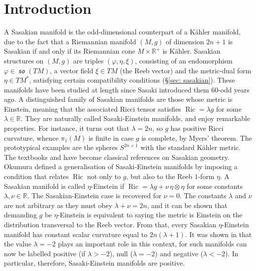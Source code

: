 \documentclass[12pt, twoside]{amsart}
\def\R{\mathbb{R}}
\newcommand{\lie}[1]{\mathfrak{#1}}
\DeclareMathOperator{\so}{\lie{so}}
\def\ric{\operatorname{Ric}}
\theoremstyle{definition}
\begin{document}
\tableofcontents


\section{Introduction}

A Sasakian manifold is the odd-dimensional counterpart of a K{\"a}hler manifold, due to the fact that a Riemannian manifold $(M, g)$ of dimension $2n+1$ is Sasakian if and only if its Riemannian cone $M\times \R^{+}$ is 
K{\"a}hler. Sasakian structures on $(M, g)$ are triples $(\varphi, \eta ,\xi)$, consisting of an endomorphism $\varphi\in\so(TM)$, a vector field $\xi\in TM$ (the Reeb vector) and the metric-dual form $\eta\in TM^*$, satisfying certain compatibility conditions (\S \ref{sec: sasakian}). These manifolds have been  studied at length since Sasaki introduced them $60$-odd years ago. 
\smallbreak 
A distinguished family of Sasakian manifolds are those whose metric is Einstein, meaning that the associated Ricci tensor satisfies $\ric=\lambda g$ for some $\lambda \in \R$. They are naturally called Sasaki-Einstein manifolds, and enjoy remarkable properties. For instance, it turns out that $\lambda=2n$, so $g$ has positive Ricci curvature, whence $\pi_1(M)$ is finite in case $g$ is complete, by Myers' theorem. The prototypical examples are the spheres $S^{2n+1}$ with the standard K{\"a}hler metric. The  textbooks  \cite{Blair} and \cite{Boyer-Kris-BOOK} have become classical references on Sasakian geometry. 
\smallbreak 
 Okumura \cite{Oku} defined a generalisation of Sasaki-Einstein manifolds by imposing a condition that relates $\ric$ not only to $g$, but also to the Reeb $1$-form $\eta$. A Sasakian manifold is called $\eta$-Einstein if $\ric=\lambda g+\nu \,\eta \otimes \eta$ for some constants $\lambda, \nu \in \R$. The Sasakian-Einstein case is recovered for $\nu=0$. The constants $\lambda$ and $\nu$ are not arbitrary as they must obey $\lambda+\nu=2n$, and it can be shown that demanding $g$ be $\eta$-Einstein is equivalent to  saying the metric is Einstein on the distribution transversal to the Reeb vector. 
 From that, every Sasakian $\eta$-Einstein manifold has constant scalar curvature equal to $2n(\lambda+ 1)$. 
It was shown in \cite{BGM} that the value $\lambda=-2$ plays an important role in this context, for such manifolds can now be labelled positive (if $\lambda > -2$), null ($\lambda=-2$) and negative ($\lambda< -2$). In particular, therefore, Sasaki-Einstein manifolds are positive. \smallbreak 
\end{document}
